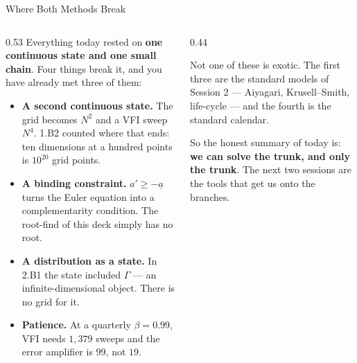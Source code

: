 \begin{frame}{Where Both Methods Break}
\begin{columns}[T]
\begin{column}{0.53\textwidth}
\small
Everything today rested on \textbf{one continuous state and one small chain}. Four things break it, and you have already met three of them:
\medskip
\begin{itemize}\footnotesize
  \item \textbf{A second continuous state.} The grid becomes $N^2$ and a VFI sweep $N^4$. 1.B2 counted where that ends: ten dimensions at a hundred points is $10^{20}$ grid points.
  \item \textbf{A binding constraint.} $a'\ge-\underline{a}$ turns the Euler equation into a complementarity condition. The root-find of this deck simply has no root.
  \item \textbf{A distribution as a state.} In 2.B1 the state included $\Gamma$ --- an infinite-dimensional object. There is no grid for it.
  \item \textbf{Patience.} At a quarterly $\beta=0.99$, VFI needs $1{,}379$ sweeps and the error amplifier is $99$, not $19$.
\end{itemize}
\end{column}
\begin{column}{0.44\textwidth}
\begin{cautionbox}\small
Not one of these is exotic. The first three are the standard models of Session 2 --- Aiyagari, Krusell--Smith, life-cycle --- and the fourth is the standard calendar.
\end{cautionbox}
\medskip
\begin{takeawaybox}\footnotesize
So the honest summary of today is: \textbf{we can solve the trunk, and only the trunk}. The next two sessions are the tools that get us onto the branches.
\end{takeawaybox}
\end{column}
\end{columns}
\end{frame}


